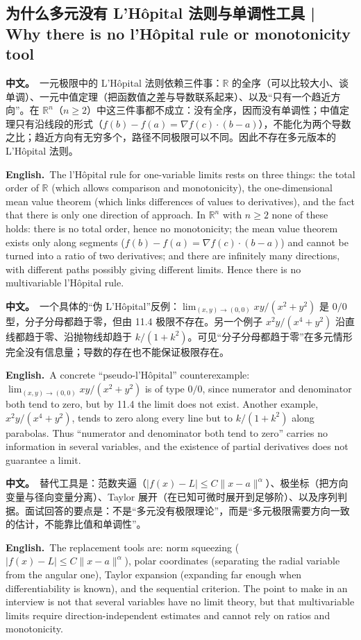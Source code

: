 \documentclass[UTF8,11pt,a4paper]{ctexart}
\newcommand{\BOTH}[2]{\par\noindent\textbf{中文。}\ #1\par\noindent\textbf{English.}\ #2\par}
\begin{document}
\subsection{为什么多元没有 L'H\^opital 法则与单调性工具 | Why there is no l'H\^opital rule or monotonicity tool}
\BOTH{一元极限中的 L'H\^opital 法则依赖三件事：$\mathbb R$ 的全序（可以比较大小、谈单调）、一元中值定理（把函数值之差与导数联系起来）、以及“只有一个趋近方向”。在 $\mathbb R^n$（$n\ge2$）中这三件事都不成立：没有全序，因而没有单调性；中值定理只有沿线段的形式（$f(b)-f(a)=\nabla f(c)\cdot(b-a)$），不能化为两个导数之比；趋近方向有无穷多个，路径不同极限可以不同。因此不存在多元版本的 L'H\^opital 法则。}{The l'H\^opital rule for one-variable limits rests on three things: the total order of $\mathbb R$ (which allows comparison and monotonicity), the one-dimensional mean value theorem (which links differences of values to derivatives), and the fact that there is only one direction of approach. In $\mathbb R^n$ with $n\ge2$ none of these holds: there is no total order, hence no monotonicity; the mean value theorem exists only along segments ($f(b)-f(a)=\nabla f(c)\cdot(b-a)$) and cannot be turned into a ratio of two derivatives; and there are infinitely many directions, with different paths possibly giving different limits. Hence there is no multivariable l'H\^opital rule.}
\BOTH{一个具体的“伪 L'H\^opital”反例：$\lim_{(x,y)\to(0,0)}xy/(x^2+y^2)$ 是 $0/0$ 型，分子分母都趋于零，但由 11.4 极限不存在。另一个例子 $x^2y/(x^4+y^2)$ 沿直线都趋于零、沿抛物线却趋于 $k/(1+k^2)$。可见“分子分母都趋于零”在多元情形完全没有信息量；导数的存在也不能保证极限存在。}{A concrete “pseudo-l'H\^opital” counterexample: $\lim_{(x,y)\to(0,0)}xy/(x^2+y^2)$ is of type $0/0$, since numerator and denominator both tend to zero, but by 11.4 the limit does not exist. Another example, $x^2y/(x^4+y^2)$, tends to zero along every line but to $k/(1+k^2)$ along parabolas. Thus “numerator and denominator both tend to zero” carries no information in several variables, and the existence of partial derivatives does not guarantee a limit.}
\BOTH{替代工具是：范数夹逼（$|f(x)-L|\le C\|x-a\|^\alpha$）、极坐标（把方向变量与径向变量分离）、Taylor 展开（在已知可微时展开到足够阶）、以及序列判据。面试回答的要点是：不是“多元没有极限理论”，而是“多元极限需要方向一致的估计，不能靠比值和单调性”。}{The replacement tools are: norm squeezing ($|f(x)-L|\le C\|x-a\|^\alpha$), polar coordinates (separating the radial variable from the angular one), Taylor expansion (expanding far enough when differentiability is known), and the sequential criterion. The point to make in an interview is not that several variables have no limit theory, but that multivariable limits require direction-independent estimates and cannot rely on ratios and monotonicity.}
\end{document}
